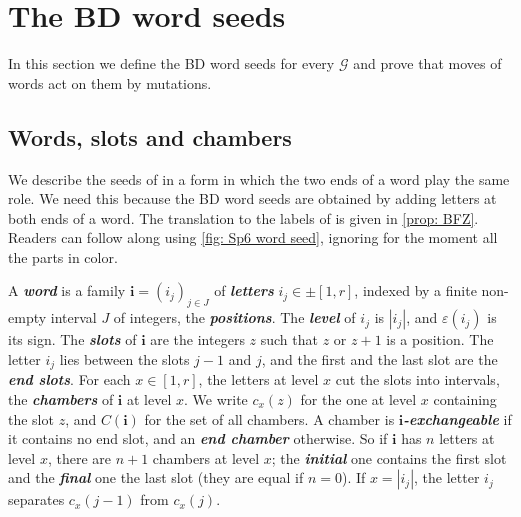\documentclass[a4paper]{amsart}
\numberwithin{equation}{section}
\theoremstyle{definition}
\theoremstyle{remark}
\newcommand{\mcG}{\mathcal{G}}
\newcommand{\bfi}{\mathbf{i}}
\newcommand{\newword}[1]{\textbf{\emph{#1}}}
\begin{document}
\section{The BD word seeds}
\label{sec: word seeds}
In this section we define the BD word seeds for every $\mcG$ and prove that moves of words act on them by mutations.

\subsection{Words, slots and chambers}
\label{sec: words}
We describe the seeds of \cite[Section~2.2]{BFZ05} in a form in which the two ends of a word play the same role.
We need this because the BD word seeds are obtained by adding letters at both ends of a word.
The translation to the labels of \cite{BFZ05} is given in \cref{prop: BFZ}.
Readers can follow along using \cref{fig: Sp6 word seed}, ignoring for the moment all the parts in color.

A \newword{word} is a family $\bfi=(i_j)_{j\in J}$ of \newword{letters} $i_j\in\pm[1,r]$, indexed by a finite non-empty interval $J$ of integers, the \newword{positions}.
The \newword{level} of $i_j$ is $|i_j|$, and $\varepsilon(i_j)$ is its sign.
The \newword{slots} of $\bfi$ are the integers $z$ such that $z$ or $z+1$ is a position.
The letter $i_j$ lies between the slots $j-1$ and $j$, and the first and the last slot are the \newword{end slots}.
For each $x\in[1,r]$, the letters at level $x$ cut the slots into intervals, the \newword{chambers} of $\bfi$ at level $x$.
We write $c_x(z)$ for the one at level $x$ containing the slot $z$, and $C(\bfi)$ for the set of all chambers.
A chamber is \newword{$\bfi$-exchangeable} if it contains no end slot, and an \newword{end chamber} otherwise.
So if $\bfi$ has $n$ letters at level $x$, there are $n+1$ chambers at level $x$; the \newword{initial} one contains the first slot and the \newword{final} one the last slot (they are equal if $n=0$).
If $x=|i_j|$, the letter $i_j$ separates $c_x(j-1)$ from $c_x(j)$.
\end{document}
